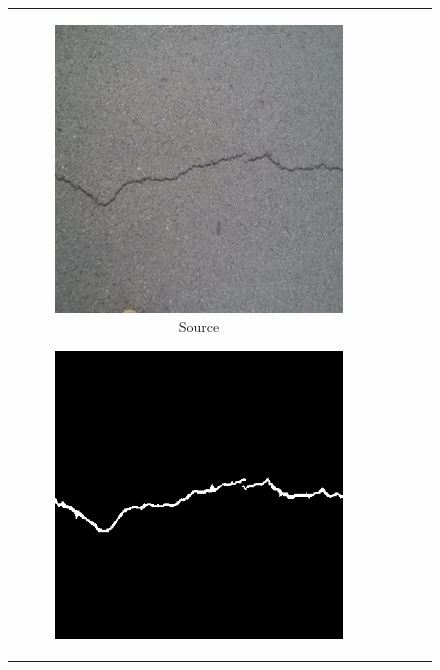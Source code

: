 \documentclass[a4paper,12pt]{report}
\begin{document}
\begin{figure}[htbp]
    \begin{tabular}{cccc}
        \begin{subfigure}[b]{0.23\textwidth}
            \centering
            \includegraphics[width=\textwidth]{res/crackseg-experiment-qualitative/source.jpg}
            \caption{Source}
            \label{fig:crackseg-experiment-qualitative-source}
        \end{subfigure}
        \begin{subfigure}[b]{0.23\textwidth}
            \centering
            \includegraphics[width=\textwidth]{res/crackseg-experiment-qualitative/ground-truth.png}

\end{subfigure}
\end{tabular}
\end{figure}
\end{document}
